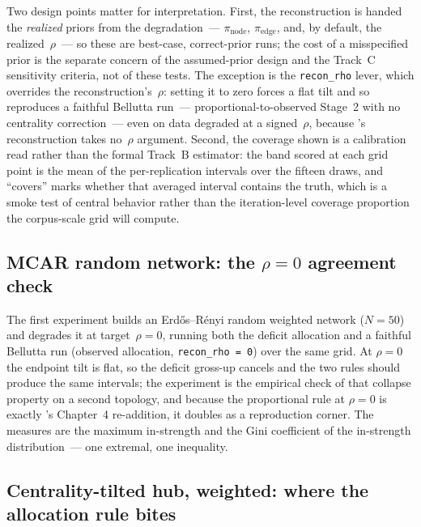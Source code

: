 \documentclass[11pt]{article}
\newcommand{\pinode}{\pi_{\text{node}}}
\newcommand{\piedge}{\pi_{\text{edge}}}
\begin{document}
Two design points matter for interpretation. First, the reconstruction is handed the
\emph{realized} priors from the degradation~--- $\pinode$, $\piedge$, and, by default,
the realized~$\rho$~--- so these are best-case, correct-prior runs; the cost of a
misspecified prior is the separate concern of the assumed-prior design and the
Track~C sensitivity criteria, not of these tests. The exception is the
\texttt{recon\_rho} lever, which overrides the reconstruction's~$\rho$: setting it to
zero forces a flat tilt and so reproduces a faithful Bellutta run~--- proportional-to-observed
Stage~2 with no centrality correction~--- even on data degraded at a signed~$\rho$,
because \citet{Bellutta2026}'s reconstruction takes no~$\rho$ argument. Second, the
coverage shown is a calibration read rather than the formal Track~B estimator: the
band scored at each grid point is the mean of the per-replication intervals over the
fifteen draws, and ``covers'' marks whether that averaged interval contains the truth,
which is a smoke test of central behavior rather than the iteration-level coverage
proportion the corpus-scale grid will compute.

\subsection{MCAR random network: the $\rho = 0$ agreement check}

The first experiment builds an Erd\H{o}s--R\'enyi random weighted network ($N = 50$)
and degrades it at target~$\rho = 0$, running both the deficit allocation and a faithful Bellutta run (observed allocation,
\texttt{recon\_rho = 0}) over the same grid. At $\rho = 0$ the endpoint tilt is flat,
so the deficit gross-up cancels and the two rules should produce the same intervals;
the experiment is the empirical check of that collapse property on a second topology,
and because the proportional rule at $\rho = 0$ is exactly \citet{Bellutta2026}'s
Chapter~4 re-addition, it doubles as a reproduction corner. The measures are the
maximum in-strength and the Gini coefficient of the in-strength
distribution~--- one extremal, one inequality.

\subsection{Centrality-tilted hub, weighted: where the allocation rule bites}
\end{document}
